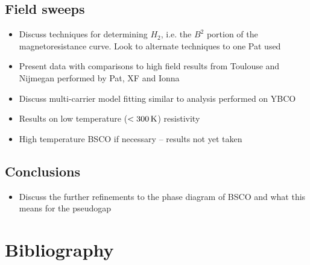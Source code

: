 \documentclass[11pt, a4paper]{article}
\begin{document}
    \subsection{Field sweeps}
        \begin{itemize}
            \item Discuss techniques for determining $H_2$, i.e. the $B^2$ portion of the magnetoresistance curve. Look to alternate techniques to one Pat used
            \item Present data with comparisons to high field results from Toulouse and Nijmegan performed by Pat, XF and Ionna
            \item Discuss multi-carrier model fitting similar to analysis performed on YBCO
            \item Results on low temperature ($<\unit[300]{K}$) resistivity
            \item High temperature BSCO if necessary -- results not yet taken
        \end{itemize}

    \subsection{Conclusions}
        \begin{itemize}
            \item Discuss the further refinements to the phase diagram of BSCO and what this means for the pseudogap
        \end{itemize}

    \section{Bibliography}
\end{document}
